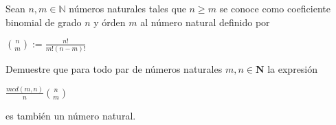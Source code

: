 \begin{problem}
	Sean $n,m \in \mathbb{N}$ números naturales tales que $n \ge m$ se conoce como coeficiente binomial de grado $n$ y órden $m$ al número natural definido por 
	
	\begin{center}
		${\displaystyle{{{n} \choose {m}} := \frac{n!}{m! (n-m)!}}}$
	\end{center}
	
	Demuestre que para todo par de números naturales $m, n \in \mathbf{N}$ la expresión 
	
	\begin{center}
		${\displaystyle{ \frac{mcd(m, n)}{n} {{n} \choose {m}} } }$
	\end{center}
	
	es también un número natural.
\end{problem}